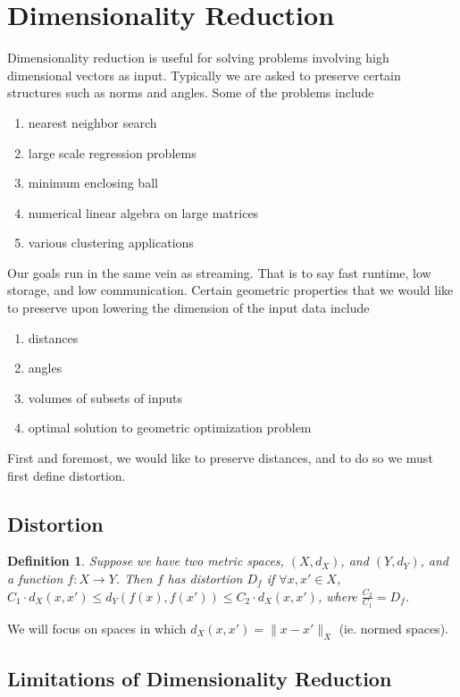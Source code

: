 \documentclass[11pt]{article}
\newtheorem{definition}[theorem]{Definition}
\begin{document}
\section{Dimensionality Reduction}
Dimensionality reduction is useful for solving problems involving high dimensional vectors as input.  Typically we are asked to preserve certain structures such as norms and angles.  Some of the problems include
\begin{enumerate}
\item nearest neighbor search
\item large scale regression problems
\item minimum enclosing ball
\item numerical linear algebra on large matrices
\item various clustering applications
\end{enumerate}
Our goals run in the same vein as streaming.  That is to say fast runtime, low storage, and low communication.  Certain geometric properties that we would like to preserve upon lowering the dimension of the input data include 
\begin{enumerate}
\item distances
\item angles
\item volumes of subsets of inputs
\item optimal solution to geometric optimization problem 
\end{enumerate}

First and foremost, we would like to preserve distances, and to do so we must first define distortion.

\subsection{Distortion}

\begin{definition}
Suppose we have two metric spaces, $(X,d_{X})$,
and $(Y,d_{Y})$, and a function $f:X\rightarrow Y$. Then $f$ has
distortion $D_{f}$ if $\forall x,x'\in X$, $C_{1}\cdot d_{X}(x,x')\leq d_{Y}(f(x),f(x'))\leq C_{2}\cdot d_{X}(x,x')$,
where $\frac{C_{2}}{C_{1}}=D_{f}$.
\end{definition}

We will focus on spaces in which $d_{X}(x,x')=\|x-x'\|_{X}$ (ie.
normed spaces).  

\subsection{Limitations of Dimensionality Reduction}
\end{document}
